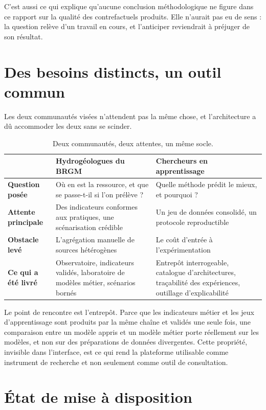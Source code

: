 C'est aussi ce qui explique qu'aucune conclusion méthodologique ne figure dans ce rapport sur la
qualité des contrefactuels produits. Elle n'aurait pas eu de sens : la question relève d'un
travail en cours, et l'anticiper reviendrait à préjuger de son résultat.

\section{Des besoins distincts, un outil commun}

Les deux communautés visées n'attendent pas la même chose, et l'architecture a dû accommoder les
deux sans se scinder.

\begin{table}[H]
\centering
\caption{Deux communautés, deux attentes, un même socle.}
\label{tab:deux-publics}
\begin{tabularx}{\textwidth}{@{}L{3.6cm}YY@{}}
\toprule
 & \textbf{Hydrogéologues du BRGM} & \textbf{Chercheurs en apprentissage} \\
\midrule
\textbf{Question posée} & Où en est la ressource, et que se passe-t-il si l'on prélève ? &
Quelle méthode prédit le mieux, et pourquoi ? \\
\textbf{Attente principale} & Des indicateurs conformes aux pratiques, une scénarisation
crédible & Un jeu de données consolidé, un protocole reproductible \\
\textbf{Obstacle levé} & L'agrégation manuelle de sources hétérogènes & Le coût d'entrée à
l'expérimentation \\
\textbf{Ce qui a été livré} & Observatoire, indicateurs validés, laboratoire de modèles métier,
scénarios bornés & Entrepôt interrogeable, catalogue d'architectures, traçabilité des
expériences, outillage d'explicabilité \\
\bottomrule
\end{tabularx}
\end{table}

Le point de rencontre est l'entrepôt. Parce que les indicateurs métier et les jeux
d'apprentissage sont produits par la même chaîne et validés une seule fois, une comparaison
entre un modèle appris et un modèle métier porte réellement sur les modèles, et non sur des
préparations de données divergentes. Cette propriété, invisible dans l'interface, est ce qui rend
la plateforme utilisable comme instrument de recherche et non seulement comme outil de
consultation.

\section{État de mise à disposition}

